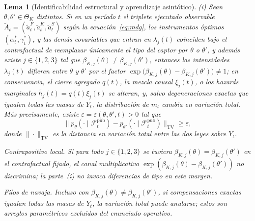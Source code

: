 \documentclass[pdflatex,sn-mathphys-ay]{sn-jnl}
\theoremstyle{thmstyleone}
\newtheorem{lemma}[theorem]{Lema}
\theoremstyle{thmstyletwo}
\theoremstyle{thmstylethree}
\newcommand{\ThetaK}{\Theta_K}
\newcommand{\1}{\mathbf{1}}
\begin{document}
\begin{lemma}[Identificabilidad estructural y aprendizaje asintótico]
\medskip
\noindent\textup{(i)}
Sean $\theta,\theta'\in\ThetaK$ distintos. Si en un período $t$ el triplete ejecutado observable $\tilde{A}_t=(\tilde{a}_t^F,\tilde{a}_t^K,\tilde{a}_t^S)$ según la ecuación~\eqref{eq:mdg}, los instrumentos óptimos $(\alpha_t^\ast,\gamma_t^\ast)$, y las demás covariables que entran en $\lambda_j(t)$ coinciden bajo el contrafactual de reemplazar únicamente el tipo del captor por $\theta$ o $\theta'$, y además existe $j\in\{1,2,3\}$ tal que $\beta_{K,j}(\theta)\neq \beta_{K,j}(\theta')$, entonces las intensidades $\lambda_j(t)$ difieren entre $\theta$ y $\theta'$ por el factor $\exp\bigl(\beta_{K,j}(\theta)-\beta_{K,j}(\theta')\bigr)\neq 1$; en consecuencia, el cierre agregado $q(t)$, la mezcla causal $\xi_j(t)$, o los hazards marginales $\bar h_j(t)=q(t)\xi_j(t)$ se alteran, y, salvo degeneraciones exactas que igualen todas las masas de $Y_t$, la distribución de $m_t$ cambia en variación total. Más precisamente, existe $\varepsilon=\varepsilon(\theta,\theta',t)>0$ tal que
\begin{equation}
\label{eq:TV-separation}
\bigl\| p_\theta(\cdot\mid \mathcal{F}_t^{\mathrm{pub}})-p_{\theta'}(\cdot\mid \mathcal{F}_t^{\mathrm{pub}})\bigr\|_{\mathrm{TV}}\ge \varepsilon,
\end{equation}
donde $\|\cdot\|_{\mathrm{TV}}$ es la distancia en variación total entre las dos leyes sobre $Y_t$.
\begin{list}{}{%
  \setlength{\leftmargin}{2.25em}%
  \setlength{\labelwidth}{2.25em}%
  \setlength{\labelsep}{0.45em}%
  \setlength{\itemsep}{0.35em}%
  \setlength{\parsep}{0pt}%
  \setlength{\topsep}{0.25em}%
}
\item[\textup{(C1)}] \textup{Contrapositivo local.}\quad
Si para todo $j\in\{1,2,3\}$ se tuviera $\beta_{K,j}(\theta)=\beta_{K,j}(\theta')$ en el contrafactual fijado, el canal multiplicativo $\exp(\beta_{K,j}(\theta)-\beta_{K,j}(\theta'))$ no discrimina; la parte~\textup{(i)} no invoca diferencias de tipo en este margen.
\item[\textup{(C2)}] \textup{Filos de navaja.}\quad
Incluso con $\beta_{K,j}(\theta)\neq\beta_{K,j}(\theta')$, si compensaciones exactas igualan todas las masas de $Y_t$, la variación total puede anularse; estos son arreglos paramétricos excluidos del enunciado operativo.
\end{list}


\end{lemma}
\end{document}
